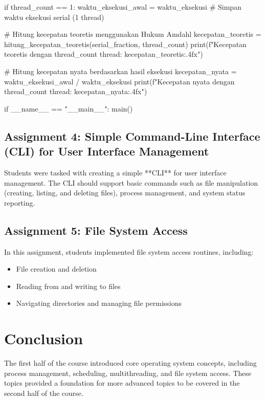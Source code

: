 \documentclass[12pt]{article}
\begin{document}
\begin{python}
            if thread_count == 1:
                waktu_eksekusi_awal = waktu_eksekusi  # Simpan waktu eksekusi serial (1 thread)

            # Hitung kecepatan teoretis menggunakan Hukum Amdahl
            kecepatan_teoretis = hitung_kecepatan_teoretis(serial_fraction, thread_count)
            print(f"Kecepatan teoretis dengan {thread_count} thread: {kecepatan_teoretis:.4f}x")

            # Hitung kecepatan nyata berdasarkan hasil eksekusi
            kecepatan_nyata = waktu_eksekusi_awal / waktu_eksekusi
            print(f"Kecepatan nyata dengan {thread_count} thread: {kecepatan_nyata:.4f}x\n")

    if __name__ == "__main__":
        main()

        \end{python}

\subsection{Assignment 4: Simple Command-Line Interface (CLI) for User Interface Management}
Students were tasked with creating a simple **CLI** for user interface management. The CLI should support basic commands such as file manipulation (creating, listing, and deleting files), process management, and system status reporting.

\subsection{Assignment 5: File System Access}
In this assignment, students implemented file system access routines, including:
\begin{itemize}
    \item File creation and deletion
    \item Reading from and writing to files
    \item Navigating directories and managing file permissions
\end{itemize}

\section{Conclusion}
The first half of the course introduced core operating system concepts, including process management, scheduling, multithreading, and file system access. These topics provided a foundation for more advanced topics to be covered in the second half of the course.
\end{document}

